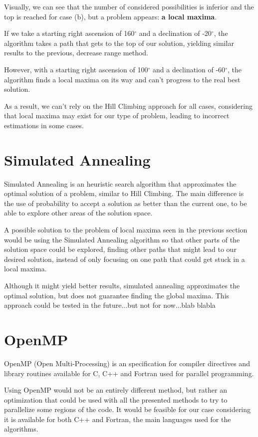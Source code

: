 Visually, we can see that the number of considered possibilities is inferior and the top is reached for case (b), but a problem appears: \textbf{a local maxima}.

If we take a starting right ascension of 160$^{\circ}$ and a declination of -20$^{\circ}$, the algorithm takes a path that gets to the top of our solution, yielding similar results to the previous, decrease range method.

However, with a starting right ascension of 100$^{\circ}$ and a declination of -60$^{\circ}$, the algorithm finds a local maxima on its way and can't progress to the real best solution.

As a result, we can't rely on the Hill Climbing approach for all cases, considering that local maxima may exist for our type of problem, leading to incorrect estimations in some cases.

\section{Simulated Annealing}

Simulated Annealing is an heuristic search algorithm that approximates the optimal solution of a problem, similar to Hill Climbing. The main difference is the use of probability to accept a solution as better than the current one, to be able to explore other areas of the solution space.

A possible solution to the problem of local maxima seen in the previous section would be using the Simulated Annealing algorithm so that other parts of the solution space could be explored, finding other paths that might lead to our desired solution, instead of only focusing on one path that could get stuck in a local maxima.

Although it might yield better results, simulated annealing approximates the optimal solution, but does not guarantee finding the global maxima. This approach could be tested in the future...but not for now...blab blabla

\section{OpenMP}

OpenMP (Open Multi-Processing) is an specification for compiler directives and library routines available for C, C++ and Fortran used for parallel programming.

Using OpenMP would not be an entirely different method, but rather an optimization that could be used with all the presented methods to try to parallelize some regions of the code. It would be feasible for our case considering it is available for both C++ and Fortran, the main languages used for the algorithms.

